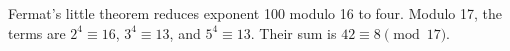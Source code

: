 Fermat's little theorem reduces exponent 100 modulo 16 to four. Modulo 17, the terms are $2^4\equiv16$, $3^4\equiv13$, and $5^4\equiv13$. Their sum is $42\equiv\boxed8\pmod{17}$.
